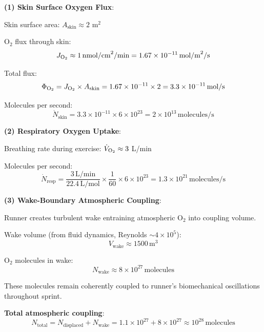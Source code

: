 \documentclass[11pt,onecolumn]{article}
\begin{document}
\textbf{(1) Skin Surface Oxygen Flux}:

Skin surface area: $A_{\text{skin}} \approx 2$ m$^2$

O$_2$ flux through skin:
\begin{equation}
J_{\ce{O2}} \approx 1\,\text{nmol/cm}^2\text{/min} = 1.67 \times 10^{-11}\,\text{mol/m}^2\text{/s}
\end{equation}

Total flux:
\begin{equation}
\Phi_{\ce{O2}} = J_{\ce{O2}} \times A_{\text{skin}} = 1.67 \times 10^{-11} \times 2 = 3.3 \times 10^{-11}\,\text{mol/s}
\end{equation}

Molecules per second:
\begin{equation}
\dot{N}_{\text{skin}} = 3.3 \times 10^{-11} \times 6 \times 10^{23} = 2 \times 10^{13}\,\text{molecules/s}
\end{equation}

\textbf{(2) Respiratory Oxygen Uptake}:

Breathing rate during exercise: $\dot{V}_{\ce{O2}} \approx 3$ L/min

Molecules per second:
\begin{equation}
\dot{N}_{\text{resp}} = \frac{3\,\text{L/min}}{22.4\,\text{L/mol}} \times \frac{1}{60} \times 6 \times 10^{23} = 1.3 \times 10^{21}\,\text{molecules/s}
\end{equation}

\textbf{(3) Wake-Boundary Atmospheric Coupling}:

Runner creates turbulent wake entraining atmospheric O$_2$ into coupling volume.

Wake volume (from fluid dynamics, Reynolds $\sim 4 \times 10^5$):
\begin{equation}
V_{\text{wake}} \approx 1500\,\text{m}^3
\end{equation}

O$_2$ molecules in wake:
\begin{equation}
N_{\text{wake}} \approx 8 \times 10^{27}\,\text{molecules}
\end{equation}

These molecules remain coherently coupled to runner's biomechanical oscillations throughout sprint.

\textbf{Total atmospheric coupling}:
\begin{equation}
N_{\text{total}} = N_{\text{displaced}} + N_{\text{wake}} = 1.1 \times 10^{27} + 8 \times 10^{27} \approx 10^{28}\,\text{molecules}
\end{equation}
\end{document}
